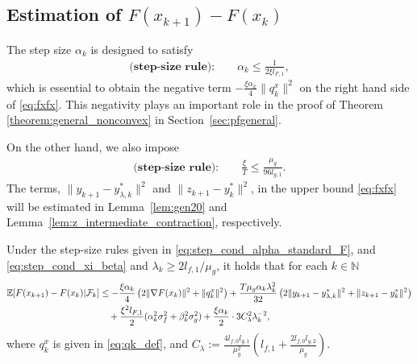 \subsection{Estimation of $F(x_{k+1}) - F(x_k)$}
\label{sec:estf}

The step size $\alpha_k$ is designed to satisfy
\begin{align}
    \textbf{(step-size rule):} \qquad \alpha_k \le \frac{1}{2\xi l_{F,1}}, \label{eq:step_cond_alpha_standard_F}
\end{align}
which is essential to obtain the negative term $- \frac{\xi \alpha_k}{4} \|q_k^x\|^2$ on the right hand side of \eqref{eq:fxfx}. This negativity plays an important role in the proof of Theorem \ref{theorem:general_nonconvex} in Section~\ref{sec:pfgeneral}.

On the other hand, we also impose
\begin{align}
    \textbf{(step-size rule):} \qquad \frac{\xi}{T} \le \frac{\mu_g}{96 l_{g,1}}
    \label{eq:step_cond_xi_beta}.
\end{align} The terms, $\|y_{k+1} - y_{\lambda, k}^*\|^2$ and $\|z_{k+1} - y_k^*\|^2$, in the upper bound \eqref{eq:fxfx} will be estimated in Lemma~\ref{lem:gen20} and Lemma~\ref{lem:z_intermediate_contraction}, respectively. 

\begin{proposition}
\label{prop:g1}
Under the step-size rules given in \eqref{eq:step_cond_alpha_standard_F}, and \eqref{eq:step_cond_xi_beta} and $\lambda_k \ge 2 l_{f,1} / \mu_g$, it holds that for each $k \in \mathbb{N}$
\begin{align}
\label{eq:fxfx}
    \mathbb{E}[ F(x_{k+1}) - F(x_k) |\mathcal{F}_k] &\le -\frac{\xi \alpha_k}{4} \left( 2 \|\nabla F(x_k)\|^2 + \|q_k^x\|^2 \right)  + \frac{T \mu_g \alpha_k \lambda_k^2}{32} \left(
    2\|y_{k+1} - y_{\lambda, k}^*\|^2 + \|z_{k+1} - y_k^*\|^2 \right) \nonumber \\
    &\quad + \frac{\xi^2 l_{F,1}}{2} (\alpha_k^2 \sigma_f^2 + \beta_k^2 \sigma_g^2) + \frac{\xi \alpha_k}{2} \cdot 3 C_\lambda^2 \lambda_k^{-2},
\end{align}
where $q_k^x$ is given in \eqref{eq:qk_def}, and $C_\lambda := \frac{4 l_{f,0} l_{g,1}}{\mu_g^2} \left(l_{f,1} + \frac{2l_{f,0} l_{g,2}}{\mu_g}\right)$.
\end{proposition}

